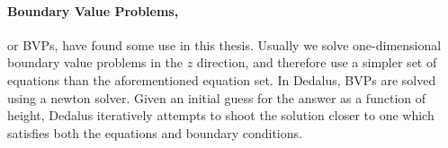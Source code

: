 \paragraph{Boundary Value Problems,} or BVPs, have found some use in this thesis.
Usually we solve one-dimensional boundary value problems in the $z$ direction, and therefore use a simpler set of equations than the aforementioned equation set.
In Dedalus, BVPs are solved using a newton solver.
Given an initial guess for the answer as a function of height, Dedalus iteratively attempts to shoot the solution closer to one which satisfies both the equations and boundary conditions.






